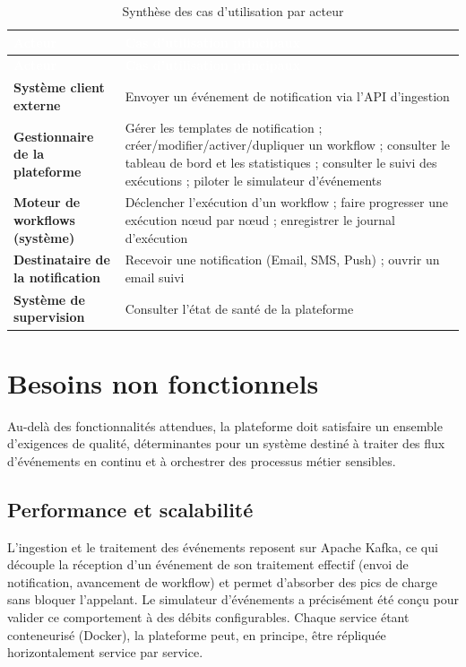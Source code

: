 \documentclass[12pt,a4paper]{report}
\begin{document}
\begin{longtable}{@{}>{\raggedright\arraybackslash}p{}p{}@{}}
\caption{Synthèse des cas d'utilisation par acteur}\\
\hline
\rowcolor{darkblue}\textcolor{white}{\textbf{Acteur}} & \textcolor{white}{\textbf{Cas d'utilisation principaux}} \\
\hline
\endfirsthead
\hline
\rowcolor{darkblue}\textcolor{white}{\textbf{Acteur}} & \textcolor{white}{\textbf{Cas d'utilisation principaux}} \\
\hline
\endhead
\hline
\endfoot
\textbf{Système client externe} & Envoyer un événement de notification via l'API d'ingestion \\
\hline
\textbf{Gestionnaire de la plateforme} & Gérer les templates de notification ; créer/modifier/activer/dupliquer un workflow ; consulter le tableau de bord et les statistiques ; consulter le suivi des exécutions ; piloter le simulateur d'événements \\
\hline
\textbf{Moteur de workflows (système)} & Déclencher l'exécution d'un workflow ; faire progresser une exécution n\oe ud par n\oe ud ; enregistrer le journal d'exécution \\
\hline
\textbf{Destinataire de la notification} & Recevoir une notification (Email, SMS, Push) ; ouvrir un email suivi \\
\hline
\textbf{Système de supervision} & Consulter l'état de santé de la plateforme \\
\hline
\end{longtable}

\section{Besoins non fonctionnels}

Au-delà des fonctionnalités attendues, la plateforme doit satisfaire un ensemble d'exigences de qualité, déterminantes pour un système destiné à traiter des flux d'événements en continu et à orchestrer des processus métier sensibles.

\subsection{Performance et scalabilité}

L'ingestion et le traitement des événements reposent sur Apache Kafka, ce qui découple la réception d'un événement de son traitement effectif (envoi de notification, avancement de workflow) et permet d'absorber des pics de charge sans bloquer l'appelant. Le simulateur d'événements a précisément été conçu pour valider ce comportement à des débits configurables. Chaque service étant conteneurisé (Docker), la plateforme peut, en principe, être répliquée horizontalement service par service.
\end{document}
